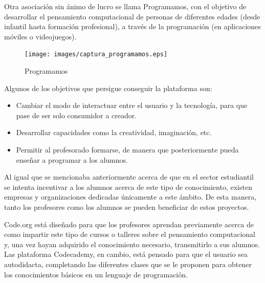 Otra asociación sin ánimo de lucro se llama Programamos, con el objetivo de desarrollar el pensamiento computacional de personas de diferentes edades (desde infantil hasta formación profesional), a través de la programación (en aplicaciones móviles o videojuegos).

\begin{figure}[!th]
\begin{center}
\texttt{[image: images/captura\_programamos.eps]}
\caption{Programamos}
\label{fig:3}
\end{center}
\end{figure}

Algunos de los objetivos que persigue conseguir la plataforma son:

\begin{itemize}
    \item Cambiar el modo de interactuar entre el usuario y la tecnología, para que pase de ser solo consumidor a creador.
    \item Desarrollar capacidades como la creatividad, imaginación, etc.
    \item Permitir al profesorado formarse, de manera que posteriormente pueda enseñar a programar a los alumnos.
\end{itemize}

Al igual que se mencionaba anteriormente acerca de que en el sector estudiantil se intenta incentivar a los alumnos acerca de este tipo de conocimiento, existen empresas y organizaciones dedicadas únicamente a este ámbito. De esta manera, tanto los profesores como los alumnos
se pueden beneficiar de estos proyectos.

Code.org está diseñado para que los profesores aprendan previamente acerca de como impartir este tipo de cursos o talleres sobre el pensamiento computacional y, una vez hayan adquirido el conocimiento necesario, transmitirlo a sus alumnos. Las plataforma Codecademy, en cambio, 
está pensado para que el usuario sea autodidacta, completando las diferentes clases que se le proponen para obtener los conocimientos básicos en un lenguaje de programación. 